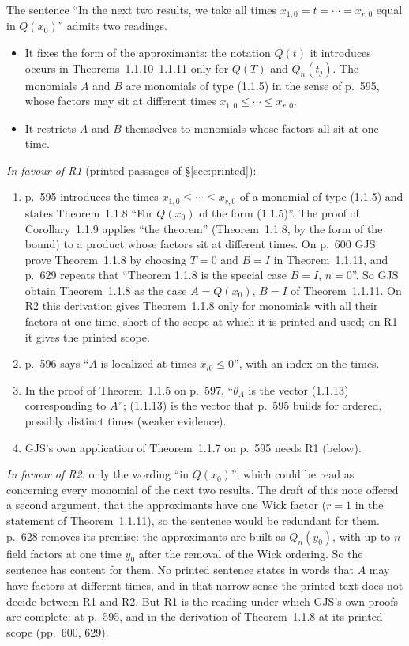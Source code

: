 \documentclass[11pt,a4paper]{article}
\theoremstyle{plain}
\theoremstyle{definition}
\begin{document}
The sentence ``In the next two results, we take all times $x_{1,0}=t=\cdots=x_{r,0}$ equal in
$Q(x_0)$'' admits two readings.
\begin{itemize}
\item[\textbf{R1}] It fixes the form of the approximants: the notation $Q(t)$ it introduces
occurs in Theorems~1.1.10--1.1.11 only for $Q(T)$ and $Q_n(t_j)$.  The monomials $A$ and $B$
are monomials of type (1.1.5) in the sense of p.~595, whose factors may sit at different times
$x_{1,0}\le\cdots\le x_{r,0}$.
\item[\textbf{R2}] It restricts $A$ and $B$ themselves to monomials whose factors all sit at one
time.
\end{itemize}
\emph{In favour of R1} (printed passages of \S\ref{sec:printed}):
\begin{enumerate}
\item[(a)] p.~595 introduces the times $x_{1,0}\le\cdots\le x_{r,0}$ of a monomial of type
(1.1.5) and states Theorem~1.1.8 ``For $Q(x_0)$ of the form (1.1.5)''.  The proof of
Corollary~1.1.9 applies ``the theorem'' (Theorem~1.1.8, by the form of the bound) to a product
whose factors sit at different times.  On p.~600 GJS prove Theorem~1.1.8 by choosing $T=0$ and
$B=I$ in Theorem~1.1.11, and p.~629 repeats that ``Theorem 1.1.8 is the special case $B=I$,
$n=0$''.  So GJS obtain Theorem~1.1.8 as the case $A=Q(x_0)$, $B=I$ of Theorem~1.1.11.  On R2
this derivation gives Theorem~1.1.8 only for monomials with all their factors at one time, short
of the scope at which it is printed and used; on R1 it gives the printed scope.
\item[(b)] p.~596 says ``$A$ is localized at times $x_{i0}\le0$'', with an index on the times.
\item[(c)] In the proof of Theorem~1.1.5 on p.~597, ``$\theta_A$ is the vector (1.1.13)
corresponding to $A$''; (1.1.13) is the vector that p.~595 builds for ordered, possibly distinct
times (weaker evidence).
\item[(d)] GJS's own application of Theorem~1.1.7 on p.~595 needs R1 (below).
\end{enumerate}
\emph{In favour of R2:} only the wording ``in $Q(x_0)$'', which could be read as concerning every
monomial of the next two results.  The draft of this note offered a second argument, that the
approximants have one Wick factor ($r=1$ in the statement of Theorem~1.1.11), so the sentence
would be redundant for them.  p.~628 removes its premise: the approximants are built as
$Q_n(y_0)$, with up to $n$ field factors at one time $y_0$ after the removal of the Wick
ordering.  So the sentence has content for them.  No printed sentence states in words that $A$
may have factors at different times, and in that narrow sense the printed text does not decide
between R1 and R2.  But R1 is the reading under which GJS's own proofs are complete: at
p.~595, and in the derivation of Theorem~1.1.8 at its printed scope (pp.~600, 629).
\end{document}
